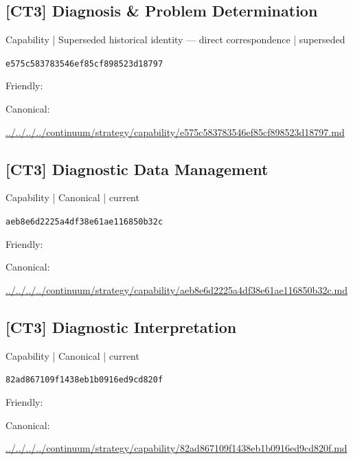 \documentclass[10pt,a4paper]{article}
\begin{document}
\subsection*{[CT3] Diagnosis \& Problem Determination}
{\small Capability | Superseded historical identity — direct correspondence | superseded}\par
\texttt{e575c583783546ef85cf898523d18797}\par
Friendly: \par
Canonical: \par
{\footnotesize\url{../../../../continuum/strategy/capability/e575c583783546ef85cf898523d18797.md}}\par
\subsection*{[CT3] Diagnostic Data Management}
{\small Capability | Canonical | current}\par
\texttt{aeb8e6d2225a4df38e61ae116850b32c}\par
Friendly: \par
Canonical: \par
{\footnotesize\url{../../../../continuum/strategy/capability/aeb8e6d2225a4df38e61ae116850b32c.md}}\par
\subsection*{[CT3] Diagnostic Interpretation}
{\small Capability | Canonical | current}\par
\texttt{82ad867109f1438eb1b0916ed9cd820f}\par
Friendly: \par
Canonical: \par
{\footnotesize\url{../../../../continuum/strategy/capability/82ad867109f1438eb1b0916ed9cd820f.md}}\par
\end{document}
